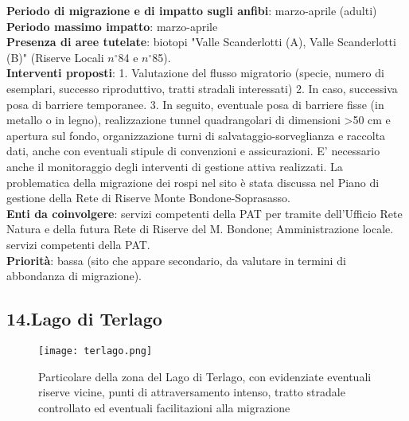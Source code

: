 \documentclass[11pt,a4paper,twoside]{memoir}
\begin{document}
\textbf{Periodo di migrazione e di impatto sugli anfibi}: marzo-aprile (adulti) \\
\textbf{Periodo massimo impatto}: marzo-aprile \\
\textbf{Presenza di aree tutelate}: biotopi "Valle Scanderlotti (A), Valle Scanderlotti (B)" (Riserve Locali $n^{\circ}$84 e $n^{\circ}$85). \\
\textbf{Interventi proposti}: 1. Valutazione del flusso migratorio (specie, numero di esemplari, successo riproduttivo, tratti stradali interessati) 2. In caso, successiva posa di barriere temporanee. 3. In seguito, eventuale posa di barriere fisse (in metallo o in legno), realizzazione tunnel quadrangolari di dimensioni >50 cm e apertura sul fondo, organizzazione turni di salvataggio-sorveglianza e raccolta dati, anche con eventuali stipule di convenzioni e assicurazioni. E' necessario anche il monitoraggio degli interventi di gestione attiva realizzati. La problematica della migrazione dei rospi nel sito è stata discussa nel Piano di gestione della Rete di Riserve Monte Bondone-Soprasasso. \\
\textbf{Enti da coinvolgere}: servizi competenti della PAT per tramite dell’Ufficio Rete Natura e della futura Rete di Riserve del M. Bondone; Amministrazione locale. servizi competenti della PAT. \\
\textbf{Priorità}: bassa (sito che appare secondario, da valutare in termini di abbondanza di migrazione). \\

\newpage
\begin{tcolorbox}[breakable,colback=white,colframe=green,width=10cm]
\subsection{14.Lago di Terlago}
\end{tcolorbox}

\begin{figure}[H]
\label{fig:map_terlago}
\centering
  \texttt{[image: terlago.png]}
\caption{Particolare della zona del Lago di Terlago, con evidenziate eventuali riserve vicine, punti di attraversamento intenso, tratto stradale controllato ed eventuali facilitazioni alla migrazione}
\end{figure}
\end{document}
